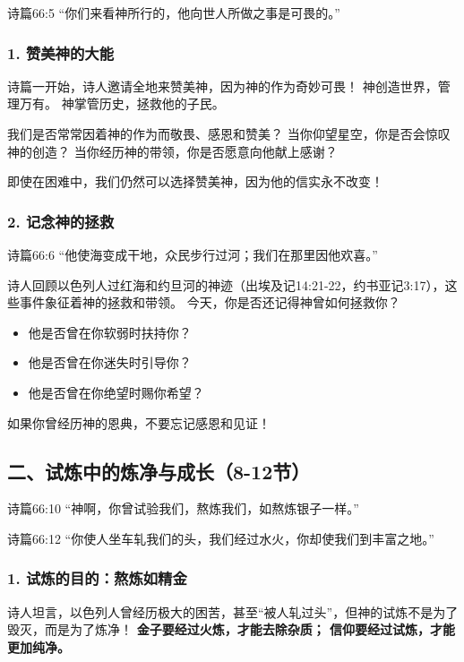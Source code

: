 \documentclass[a4paper, 12pt]{article}
\begin{document}
诗篇66:5 “你们来看神所行的，他向世人所做之事是可畏的。”
\subsubsection*{1. 赞美神的大能}
\hspace{0.6cm}诗篇一开始，诗人邀请全地来赞美神，因为神的作为奇妙可畏！
神创造世界，管理万有。
神掌管历史，拯救他的子民。

我们是否常常因着神的作为而敬畏、感恩和赞美？
当你仰望星空，你是否会惊叹神的创造？
当你经历神的带领，你是否愿意向他献上感谢？

即使在困难中，我们仍然可以选择赞美神，因为他的信实永不改变！
\subsubsection*{2. 记念神的拯救}
诗篇66:6 “他使海变成干地，众民步行过河；我们在那里因他欢喜。”

诗人回顾以色列人过红海和约旦河的神迹（出埃及记14:21-22，约书亚记3:17），这些事件象征着神的拯救和带领。
今天，你是否还记得神曾如何拯救你？
\begin{itemize}
    \item 他是否曾在你软弱时扶持你？

    \item 他是否曾在你迷失时引导你？

    \item 他是否曾在你绝望时赐你希望？

\end{itemize}

如果你曾经历神的恩典，不要忘记感恩和见证！

\subsection*{二、试炼中的炼净与成长（8-12节）}
\hspace{0.6cm}诗篇66:10 “神啊，你曾试验我们，熬炼我们，如熬炼银子一样。”

诗篇66:12 “你使人坐车轧我们的头，我们经过水火，你却使我们到丰富之地。”
\subsubsection*{1. 试炼的目的：熬炼如精金}

\hspace{0.6cm}诗人坦言，以色列人曾经历极大的困苦，甚至“被人轧过头”，但神的试炼不是为了毁灭，而是为了炼净！
\textbf{金子要经过火炼，才能去除杂质；
信仰要经过试炼，才能更加纯净。}
\end{document}
